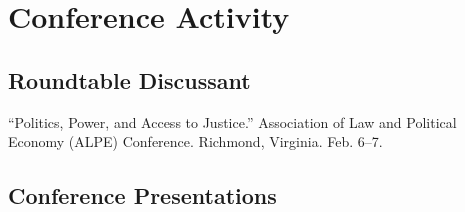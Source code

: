 \documentclass[11pt,letterpaper]{report}
\begin{document}
    


    \section*{Conference Activity}

    

    \subsection*{Roundtable Discussant}

    \begin{tablist}
        \item[2026] \tab{}\enquote{Politics, Power, and Access to Justice.} Association of Law and Political Economy (ALPE) Conference. Richmond, Virginia. Feb. 6--7.
    \end{tablist}

    \subsection*{Conference Presentations}
\end{document}

